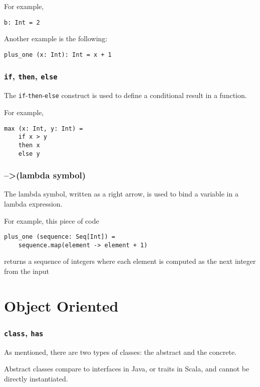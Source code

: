 \documentclass[12pt,a4paper]{book}
\newcommand{\srccode}[1]{\texttt{{#1}}}
\newcommand{\reservedWord}[1]{{\color{blue}\srccode{#1}}\xspace}
\newcommand{\sif}{\reservedWord{if}}
\newcommand{\sthen}{\reservedWord{then}}
\newcommand{\selse}{\reservedWord{else}}
\newcommand{\sclass}{\reservedWord{class}}
\newcommand{\shas}{\reservedWord{has}}
\newcommand{\lambdaSymbol}{{\tiny--\textgreater}\xspace}
\begin{document}
    For example,
    \begin{lstlisting}[label={lst:exampleType01}]
  b: Int = 2
    \end{lstlisting}

    Another example is the following:
    \begin{lstlisting}[label={lst:exampleType02}]
  plus_one (x: Int): Int = x + 1
    \end{lstlisting}

    \subsubsection{\sif, \sthen, \selse}

    The \sif-\sthen-\selse construct is used to define a conditional result in a function.

    For example,
    \begin{lstlisting}[label={lst:exampleIfThenElse}]
  max (x: Int, y: Int) =
    if x > y
    then x
    else y
    \end{lstlisting}

    \subsubsection{\lambdaSymbol (lambda symbol)}

    The lambda symbol, written as a right arrow, is used to bind a variable in a lambda expression.

    For example, this piece of code
    \begin{lstlisting}[label={lst:exampleLambda}]
  plus_one (sequence: Seq[Int]) =
    sequence.map(element -> element + 1)
    \end{lstlisting}
    returns a sequence of integers where each element is computed as the next integer from the input


    \section{Object Oriented}

    \subsubsection{\sclass, \shas}

    As mentioned, there are two types of classes: the abstract and the concrete.

    Abstract classes compare to interfaces in Java, or traits in Scala, and cannot be directly instantiated.
\end{document}
